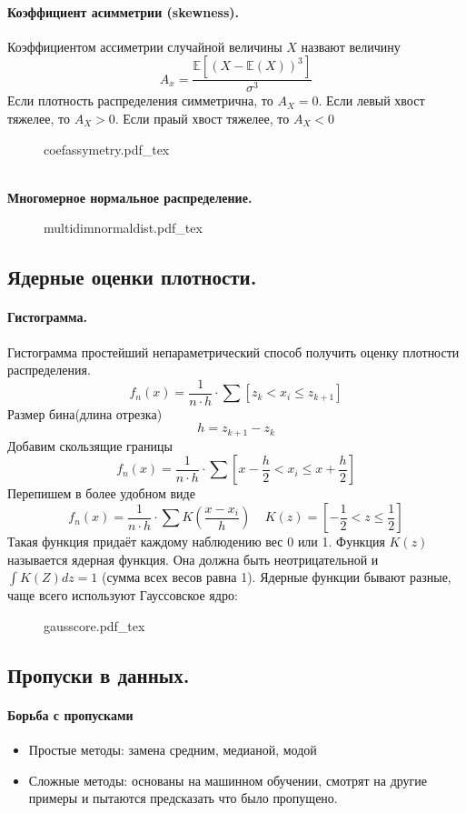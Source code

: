 \documentclass{article}
\newcommand{\E}{\mathbb{E}}
\newcommand{\incfig}[2][1]{%
    \def\svgwidth{#1\columnwidth}
    {#2.pdf_tex}
}
\begin{document}
\paragraph{Коэффициент асимметрии (skewness).}
Коэффициентом ассиметрии случайной величины $X$ назвают величину
\[
A_x=\frac{\E[(X-\E(X))^3]}{\sigma^3}
\]
Если плотность распределения симметрична, то $A_X = 0$. Если левый хвост тяжелее, то $A_X>0$. Если праый хвост тяжелее, то $A_X<0$
\begin{figure}[h!]
  \centering
  \incfig{coefassymetry}
\end{figure}
\\
{\bf Многомерное нормальное распределение.}
\begin{figure}[h!]
  \centering
  \incfig{multidimnormaldist}
\end{figure}
\subsection{Ядерные оценки плотности.}
\paragraph{Гистограмма.}
Гистограмма простейший непараметрический способ получить оценку плотности распределения.
\[
f_n(x)=\frac{1}{n\cdot h} \cdot \sum [z_k < x_i \leq z_{k+1}]
\]
Размер бина(длина отрезка)
\[
h = z_{k+1}-z_k
\]
Добавим скользящие границы
\[
f_n(x)=\frac{1}{n\cdot h} \cdot \sum [x - \frac{h}{2} < x_i \leq x + \frac{h}{2}]
\]
Перепишем в более удобном виде
\[
f_n(x)=\frac{1}{n\cdot h} \cdot \sum K(\frac{x-x_i}{h}) \; \; \; \; K(z)=[-\frac{1}{2} <z \leq \frac{1}{2}]
\]
Такая функция придаёт каждому наблюдению вес 0 или 1. Функция $K(z)$ называется ядерная функция. Она должна быть неотрицательной и $\int K(Z)dz=1$ (сумма всех весов равна 1). Ядерные функции бывают разные, чаще всего используют Гауссовское ядро:
\begin{figure}[h!]
  \centering
  \incfig{gausscore}
\end{figure}
\newpage
\subsection{Пропуски в данных.}
\paragraph{Борьба с пропусками}
\begin{itemize}
  \item Простые методы: замена средним, медианой, модой
  \item Сложные методы: основаны на машинном обучении, смотрят на другие примеры и пытаются предсказать что было пропущено.
\end{itemize}
\end{document}
